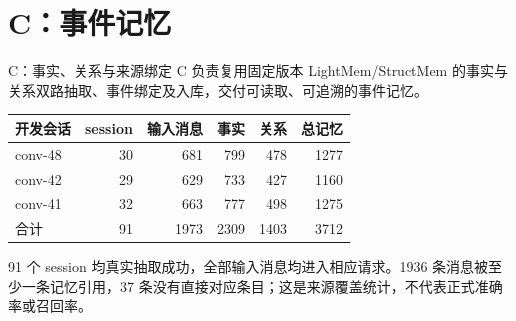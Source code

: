 \section{C：事件记忆}
\begin{frame}{C：事实、关系与来源绑定}
\small
C 负责复用固定版本 LightMem/StructMem 的事实与关系双路抽取、事件绑定及入库，交付可读取、可追溯的事件记忆。\par\vspace{2mm}
\begin{tabularx}{\linewidth}{@{}Yrrrrr@{}}
\toprule
开发会话 & session & 输入消息 & 事实 & 关系 & 总记忆\\\midrule
conv-48 & 30 & 681 & 799 & 478 & 1277\\
conv-42 & 29 & 629 & 733 & 427 & 1160\\
conv-41 & 32 & 663 & 777 & 498 & 1275\\\midrule
合计 & 91 & 1973 & 2309 & 1403 & 3712\\\bottomrule
\end{tabularx}\par\vspace{2mm}
91 个 session 均真实抽取成功，全部输入消息均进入相应请求。1936 条消息被至少一条记忆引用，37 条没有直接对应条目；这是来源覆盖统计，不代表正式准确率或召回率。
\end{frame}
